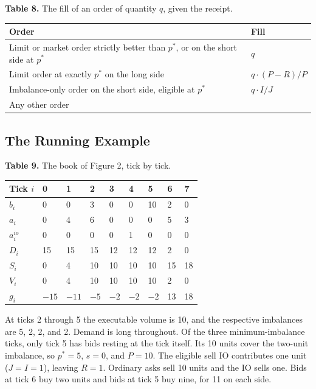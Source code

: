 \textbf{Table 8.} The fill of an order of quantity \(q\), given the receipt.

\begin{longtable}{@{}
  >{\raggedright\arraybackslash}p{}
  >{\raggedright\arraybackslash}p{}
@{}}
\toprule
Order & Fill \\
\midrule
\endhead
\bottomrule
\endlastfoot

Limit or market order strictly better than \(p^*\), or on the short side at \(p^*\)
  & \(q\) \\
Limit order at exactly \(p^*\) on the long side
  & \(q \cdot (P - R)/P\) \\
Imbalance-only order on the short side, eligible at \(p^*\)
  & \(q \cdot I/J\) \\
Any other order
  & 0 \\
\end{longtable}

\subsection{The Running Example}

\textbf{Table 9.} The book of Figure 2, tick by tick.

\begin{longtable}[]{@{}lllllllll@{}}
\toprule\noalign{}
Tick \(i\) & 0 & 1 & 2 & 3 & 4 & 5 & 6 & 7 \\
\midrule\noalign{}
\endhead
\bottomrule\noalign{}
\endlastfoot
\(b_i\) & 0 & 0 & 3 & 0 & 0 & 10 & 2 & 0 \\
\(a_i\) & 0 & 4 & 6 & 0 & 0 & 0 & 5 & 3 \\
\(a^{io}_i\) & 0 & 0 & 0 & 0 & 1 & 0 & 0 & 0 \\
\(D_i\) & 15 & 15 & 15 & 12 & 12 & 12 & 2 & 0 \\
\(S_i\) & 0 & 4 & 10 & 10 & 10 & 10 & 15 & 18 \\
\(V_i\) & 0 & 4 & 10 & 10 & 10 & 10 & 2 & 0 \\
\(g_i\) & \(-15\) & \(-11\) & \(-5\) & \(-2\) & \(-2\) & \(-2\) & 13 & 18 \\
\end{longtable}

At ticks 2 through 5 the executable volume is 10, and the respective imbalances are 5, 2, 2, and 2. Demand is long throughout. Of the three minimum-imbalance ticks, only tick 5 has bids resting at the tick itself. Its 10 units cover the two-unit imbalance, so \(p^*=5\), \(s=0\), and \(P=10\). The eligible sell IO contributes one unit (\(J=I=1\)), leaving \(R=1\). Ordinary asks sell 10 units and the IO sells one. Bids at tick 6 buy two units and bids at tick 5 buy nine, for 11 on each side.

